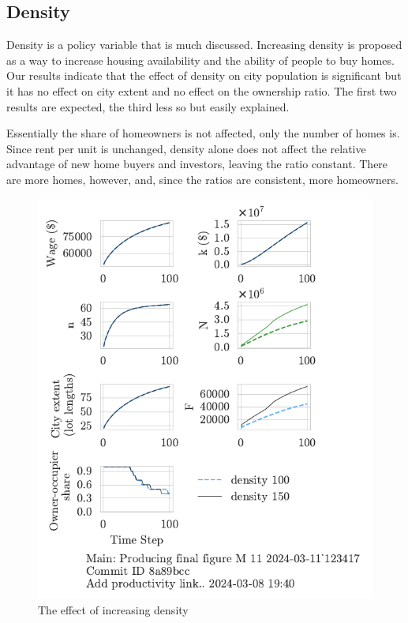 \newpage
\subsection{Density}
Density is a policy variable that is much discussed. Increasing density is proposed as a way to increase housing availability and the ability of people to buy homes. Our results indicate that the effect of density on city population is significant but it has no effect on city extent and no effect on the ownership ratio. The first two results are expected, the third less so but easily explained. 

Essentially the share of homeowners is not affected, only the number of homes is. Since rent per unit is unchanged, density alone does not affect the relative advantage of new home buyers and investors, leaving the ratio constant. There are more homes, however, and, since the ratios are consistent, more homeowners. 

\begin{figure}[h!bt]
    \centering
    \includegraphics[scale=1, trim={0 1.4cm 0 0},clip]{fig/density-Main-123417.pdf}
    \caption{The effect of increasing density}
    \label{fig:density_ownership_trajectory}
\end{figure}


